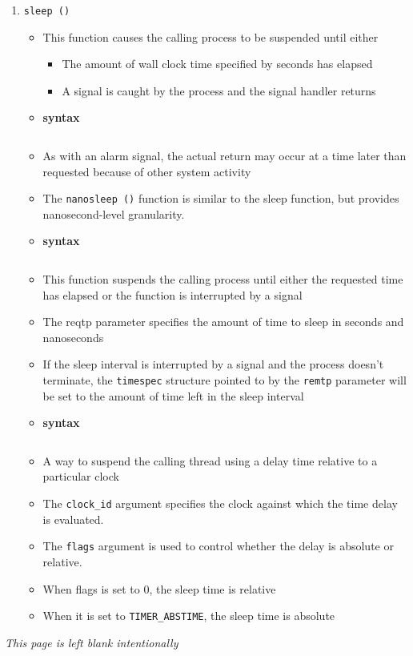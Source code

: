\documentclass{article}
\begin{document}
\begin{enumerate}
\begin{enumerate}[label=\roman*)]
\begin{itemize}
\begin{itemize}
						\end{itemize}
					\end{itemize}
				\item \texttt{sleep ()}
					\begin{itemize}
						\item This function causes the calling process to be suspended until either
							\begin{itemize}
								\item The amount of wall clock time specified by seconds has elapsed
								\item A signal is caught by the process and the signal handler returns
							\end{itemize}
						\item \textbf{syntax} \inputminted{c}{functions/sleep.c}
						\item As with an alarm signal, the actual return may occur at a time later than
							requested because of other system activity
						\item The \texttt{nanosleep ()} function is similar to the sleep function, but
							provides nanosecond-level granularity.
						\item \textbf{syntax} \inputminted{c}{functions/nanosleep.c}
						\item This function suspends the calling process until either the requested time has
							elapsed or the function is interrupted by a signal
						\item The reqtp parameter specifies the amount of time to sleep in seconds and
							nanoseconds
						\item If the sleep interval is interrupted by a signal and the process doesn't
							terminate, the \verb|timespec| structure pointed to by the \verb|remtp| parameter
							will be set to the amount of time left in the sleep interval
						\item \textbf{syntax} \inputminted{c}{functions/clock_nanosleep.c}
						\item A way to suspend the calling thread using a delay time relative to a particular
							clock
						\item The \verb|clock_id| argument specifies the clock against which the time delay is
							evaluated.
						\item The \verb|flags| argument is used to control whether the delay is absolute or
							relative.
						\item When flags is set to 0, the sleep time is relative
						\item When it is set to \verb|TIMER_ABSTIME|, the sleep time is absolute
					\end{itemize}
			\end{enumerate}
	\end{enumerate} \newpage
	\vspace*{\fill} \thispagestyle{empty}
			\centering \emph{This page is left blank intentionally}
	\vfill
\end{document}
